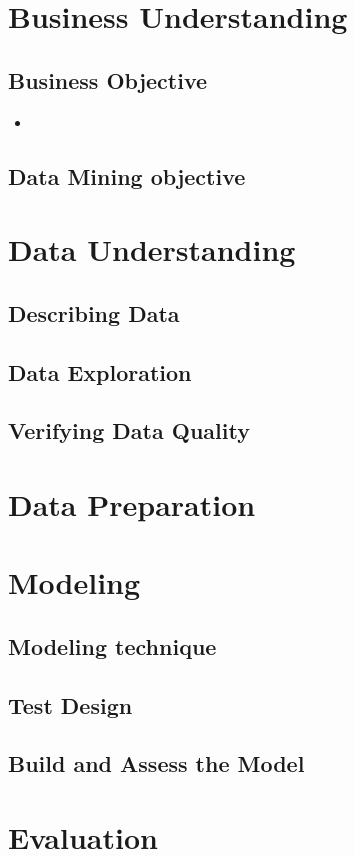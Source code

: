 
\section*{Business Understanding}
 

\subsection*{Business Objective}

\begin{itemize}
	\item  
\end{itemize}

\subsection*{Data Mining objective}
\begin{itemize}

\end{itemize}



\section*{Data Understanding}

\subsection*{Describing Data}
\subsection*{Data Exploration}
\subsection*{Verifying Data Quality}


\section*{Data Preparation}


\section*{Modeling}

\subsection*{Modeling technique}
\subsection*{Test Design}
\subsection*{Build and Assess the Model}


\section*{Evaluation}